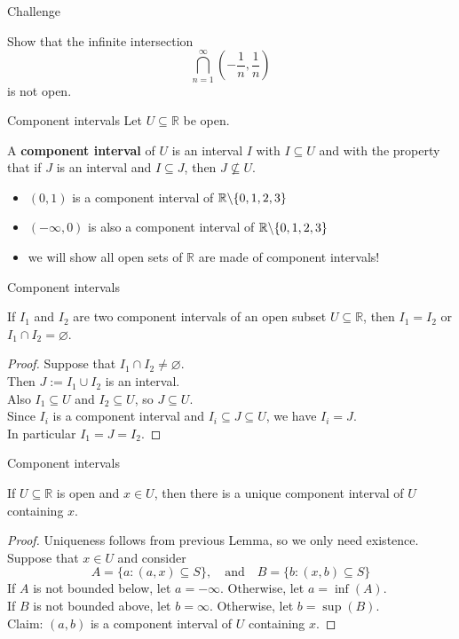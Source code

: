 \documentclass{beamer}
\begin{document}
\begin{frame}{Challenge}
\begin{prob}
Show that the infinite intersection
$$\bigcap_{n=1}^\infty (-\frac{1}{n},\frac{1}{n})$$
is not open.
\end{prob}
\end{frame}

\begin{frame}{Component intervals}
Let $U\subseteq \mathbb{R}$ be open.
\pause
\begin{defn}
A \textbf{component interval} of $U$ is an interval $I$ with $I\subseteq U$ and with the property that if $J$ is an interval and $I\subseteq J$, then $J\nsubseteq U$.
\end{defn}
\begin{itemize}
\pause
\item $(0,1)$ is a component interval of $\mathbb{R}\backslash \{0,1,2,3\}$
\pause
\item $(-\infty,0)$ is also a component interval of $\mathbb{R}\backslash \{0,1,2,3\}$
\pause
\item we will show all open sets of $\mathbb{R}$ are made of component intervals!
\end{itemize}
\end{frame}

\begin{frame}{Component intervals}
\begin{lemma}
If $I_1$ and $I_2$ are two component intervals of an open subset $U\subseteq\mathbb{R}$, then $I_1=I_2$ or $I_1\cap I_2 = \varnothing$.
\end{lemma}
\pause
\begin{proof}
\pause
Suppose that $I_1\cap I_2 \neq \varnothing$.\\
\pause
Then $J := I_1\cup I_2$ is an interval.\\
\pause
Also $I_1\subseteq U$ and $I_2\subseteq U$, so $J\subseteq U$.\\
\pause
Since $I_i$ is a component interval and $I_i\subseteq J\subseteq U$, we have $I_i = J$.\\
\pause
In particular $I_1 = J = I_2$.
\end{proof}
\end{frame}

\begin{frame}{Component intervals}
\begin{thm}[Apostol 3.10]
If $U\subseteq\mathbb{R}$ is open and $x\in U$, then there is a unique component interval of $U$ containing $x$.
\end{thm}
\pause
\begin{proof}
Uniqueness follows from previous Lemma, so we only need existence.\\
\pause
Suppose that $x\in U$ and consider
$$A = \{a: (a,x)\subseteq S\},\quad\text{and}\quad B = \{b: (x,b)\subseteq S\}$$
\pause
If $A$ is not bounded below, let $a=-\infty$.  Otherwise, let $a = \inf (A)$.\\
\pause
If $B$ is not bounded above, let $b=\infty$.  Otherwise, let $b = \sup (B)$.\\
\pause
Claim: $(a,b)$ is a component interval of $U$ containing $x$.
\end{proof}
\end{frame}
\end{document}
